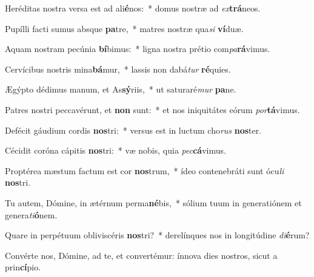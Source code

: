 \item Heréditas nostra versa est ad ali\textbf{é}nos:~* domus nostræ ad \textit{ex}\textbf{trá}neos.
\item Pupílli facti sumus absque \textbf{pa}tre,~* matres nostræ qua\textit{si} \textbf{ví}duæ.
\item Aquam nostram pecúnia \textbf{bí}bimus:~* ligna nostra prétio com\textit{pa}\textbf{rá}vimus.
\item Cervícibus nostris mina\textbf{bá}mur,~* lassis non dabá\textit{tur} \textbf{ré}quies.
\item Ægýpto dédimus manum, et As\textbf{sý}riis,~* ut saturaré\textit{mur} \textbf{pa}ne.
\item Patres nostri peccavérunt, et \textbf{non} sunt:~* et nos iniquitátes eórum \textit{por}\textbf{tá}vimus.
\item Defécit gáudium cordis \textbf{nos}tri:~* versus est in luctum cho\textit{rus} \textbf{nos}ter.
\item Cécidit coróna cápitis \textbf{nos}tri:~* væ nobis, quia \textit{pec}\textbf{cá}vimus.
\item Proptérea mæstum factum est cor \textbf{nos}trum,~* ídeo contenebráti sunt ócu\textit{li} \textbf{nos}tri.
\item Tu autem, Dómine, in ætérnum perma\textbf{né}bis,~* sólium tuum in generatiónem et genera\textit{ti}\textbf{ó}nem.
\item Quare in perpétuum obliviscéris \textbf{nos}tri?~* derelínques nos in longitúdine \textit{di}\textbf{é}rum?
\item Convérte nos, Dómine, ad te, et convertémur: ínnova dies nostros, sicut a prin\textbf{cí}pio.

